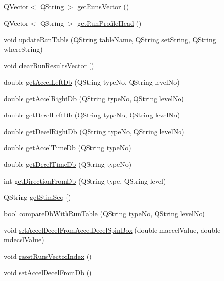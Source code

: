 \begin{DoxyCompactItemize}
\item 
Q\+Vector$<$ Q\+String $>$ \hyperlink{class_parse_run_profile_aa55bcd03acbae8ae4dbb93125982f7fc}{get\+Runs\+Vector} ()
\item 
Q\+Vector$<$ Q\+String $>$ \hyperlink{class_parse_run_profile_abb40056301c358e483699910dae9e83c}{get\+Run\+Profile\+Head} ()
\item 
void \hyperlink{class_parse_run_profile_a01b21a62fe9b4e334fe0718416510340}{update\+Run\+Table} (Q\+String table\+Name, Q\+String set\+String, Q\+String where\+String)
\item 
void \hyperlink{class_parse_run_profile_aa00fa199f81ef8745e8e2c1e086cdf00}{clear\+Run\+Results\+Vector} ()
\item 
double \hyperlink{class_parse_run_profile_a482223e0ef3037dc97ae244ef1a481ae}{get\+Accel\+Left\+Db} (Q\+String type\+No, Q\+String level\+No)
\item 
double \hyperlink{class_parse_run_profile_a526525e13096922f1523c2b6fb4ab802}{get\+Accel\+Right\+Db} (Q\+String type\+No, Q\+String level\+No)
\item 
double \hyperlink{class_parse_run_profile_a4b1aad790977725a7daf4fff854b0cb6}{get\+Decel\+Left\+Db} (Q\+String type\+No, Q\+String level\+No)
\item 
double \hyperlink{class_parse_run_profile_a2572529efbd0c733afb3a771223a859c}{get\+Decel\+Right\+Db} (Q\+String type\+No, Q\+String level\+No)
\item 
double \hyperlink{class_parse_run_profile_a94a349a23a034367a6bdf770a8e4514b}{get\+Accel\+Time\+Db} (Q\+String type\+No)
\item 
double \hyperlink{class_parse_run_profile_a02fea0744103223c7b7462a5a2054c52}{get\+Decel\+Time\+Db} (Q\+String type\+No)
\item 
int \hyperlink{class_parse_run_profile_a314fabde62110ee4da32de14e5b5c607}{get\+Direction\+From\+Db} (Q\+String type, Q\+String level)
\item 
Q\+String \hyperlink{class_parse_run_profile_a4778a2e2bc77c46a0686c548d218739b}{get\+Stim\+Seq} ()
\item 
bool \hyperlink{class_parse_run_profile_a474ddfd418805f06313732935611ac37}{compare\+Db\+With\+Run\+Table} (Q\+String type\+No, Q\+String level\+No)
\item 
void \hyperlink{class_parse_run_profile_aabc8065fa18e650ba1ed9eebd4c87938}{set\+Accel\+Decel\+From\+Accel\+Decel\+Spin\+Box} (double maccel\+Value, double mdecel\+Value)
\item 
void \hyperlink{class_parse_run_profile_aa5c2150a210598d9f14a04ff847ee0f3}{reset\+Runs\+Vector\+Index} ()
\item 
void \hyperlink{class_parse_run_profile_abd04ee7860c35aa5a87442c67ad38452}{set\+Accel\+Decel\+From\+Db} ()
\end{DoxyCompactItemize}


